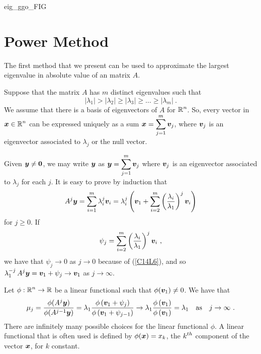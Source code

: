 {eig_ggo_FIG}

\section{Power Method}

The first method that we present can be used to approximate the largest
eigenvalue in absolute value of an \nn matrix $A$.

Suppose that the \nn matrix $A$ has $m$ distinct eigenvalues such that
\begin{equation} \label{C14L6}
|\lambda_1| > |\lambda_2| \geq |\lambda_3| \geq \ldots \geq |\lambda_m| \ .
\end{equation}
We assume that there is a basis of eigenvectors of $A$ for
$\displaystyle \mathbb{R}^n$.
So, every vector in $\displaystyle \bm{x} \in \mathbb{R}^n$ can be expressed
uniquely as a sum $\displaystyle \bm{x} = \sum_{j=1}^m \bm{v}_j$, where
$\bm{v}_j$ is an eigenvector associated to $\lambda_j$ or the null
vector.

Given $\bm{y} \neq \bm{0}$, we may write $\bm{y}$ as
$\displaystyle \bm{y} = \sum_{j=1}^m \bm{v}_j$ where
$\bm{v}_j$ is an eigenvector associated to $\lambda_j$ for each $j$.
It is easy to prove by induction that
\[
A^j \bm{y} = \sum_{i=1}^m  \lambda_i^j \bm{v}_i
= \lambda_i^j \left(\bm{v}_1 + \sum_{i=2}^m
\left(\frac{\lambda_i}{\lambda_1}\right)^j \bm{v}_i \right)
\]
for $j\geq 0$.  If
\[
\psi_j = \sum_{i=2}^m \left(\frac{\lambda_i}{\lambda_1}\right)^j \bm{v}_i \ ,
\]
we have that $\psi_j \rightarrow 0$ as $j\rightarrow 0$ because of 
(\ref{C14L6}), and so
$\displaystyle \lambda_1^{-j}\, A^j\bm{y} = \bm{v}_1 + \psi_j \to \bm{v}_1$
as $j \rightarrow \infty$.

Let $\displaystyle \phi:\mathbb{R}^n \rightarrow \mathbb{R}$ be a linear functional
such that $\phi(\bm{v}_1) \neq 0$.  We have that
\[
\mu_j = \frac{\phi(A^j\bm{y})}{\phi(A^{j-1}\bm{y})}
= \lambda_1 \frac{\phi\left( \bm{v}_1 + \psi_j \right)}
{\phi\left( \bm{v}_1 + \psi_{j-1}\right)} \rightarrow
\lambda_1 \frac{\phi\left( \bm{v}_1\right)}
{\phi\left( \bm{v}_1\right)} = \lambda_1
\quad \text{as} \quad j\rightarrow \infty \ .
\]
There are infinitely many possible choices for the linear functional
$\phi$.  A linear functional that is often used is defined by
$\phi(\bm{x}) = x_k$, the $\displaystyle k^{th}$ component of the
vector $\bm{x}$, for $k$ constant.

